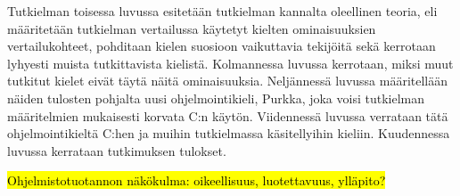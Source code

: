 %


Tutkielman toisessa luvussa esitetään tutkielman kannalta oleellinen
teoria, eli määritetään tutkielman vertailussa käytetyt kielten ominaisuuksien
vertailukohteet, pohditaan kielen suosioon vaikuttavia tekijöitä sekä kerrotaan
lyhyesti muista tutkittavista kielistä. Kolmannessa luvussa kerrotaan, miksi
muut tutkitut kielet eivät täytä näitä ominaisuuksia. Neljännessä luvussa
määritellään näiden tulosten pohjalta uusi ohjelmointikieli, Purkka, joka voisi
tutkielman määritelmien mukaisesti korvata C:n käytön. Viidennessä luvussa
verrataan tätä ohjelmointikieltä C:hen ja muihin tutkielmassa käsitellyihin
kieliin. Kuudennessa luvussa kerrataan tutkimuksen tulokset.

\hl{Ohjelmistotuotannon näkökulma: oikeellisuus, luotettavuus, ylläpito?}
